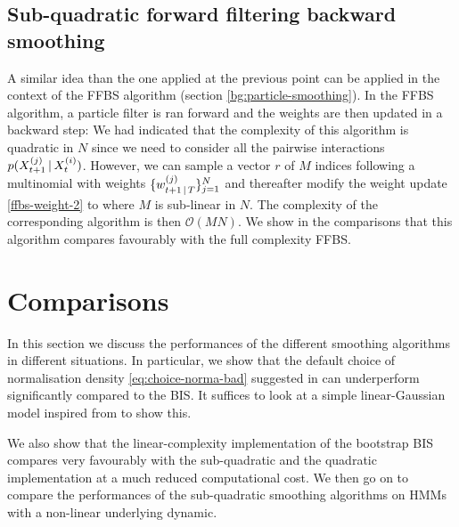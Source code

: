 \subsection{Sub-quadratic forward filtering backward smoothing}
A similar idea than the one applied at the previous point can be applied in the context of the FFBS algorithm (section \ref{bg:particle-smoothing}).
In the FFBS algorithm, a particle filter is ran forward and the weights are then updated in a backward step:
%
%
We had indicated that the complexity of this algorithm is quadratic in $N$ since we need to consider all the pairwise interactions $p(X^{(j)}_{t+1}\,|\, X^{(i)}_{t})$. 
However, we can sample a vector $r$ of $M$ indices following a multinomial with weights $\{w^{(j)}_{t+1\,|\, T}\}_{j=1}^{N}$ and thereafter modify the weight update \eqref{ffbs-weight-2} to
%
%
where $M$ is sub-linear in $N$. The complexity of the corresponding algorithm is then $\mathcal O(MN)$. We show in the comparisons that this algorithm compares favourably with the full complexity FFBS. 

\section{Comparisons}

In this section we discuss the performances of the different smoothing algorithms in different situations. 
In particular, we show that the default choice of normalisation density \eqref{eq:choice-norma-bad} suggested in \citep{briers10,fearnhead10} can underperform significantly compared to the BIS. It suffices to look at a simple linear-Gaussian model inspired from \citep{fearnhead10} to show this.

We also show that the linear-complexity implementation of the bootstrap BIS compares very favourably with the sub-quadratic and the quadratic implementation at a much reduced computational cost.  We then go on to compare the performances of the sub-quadratic smoothing algorithms on HMMs with a non-linear underlying dynamic.

\newpage

